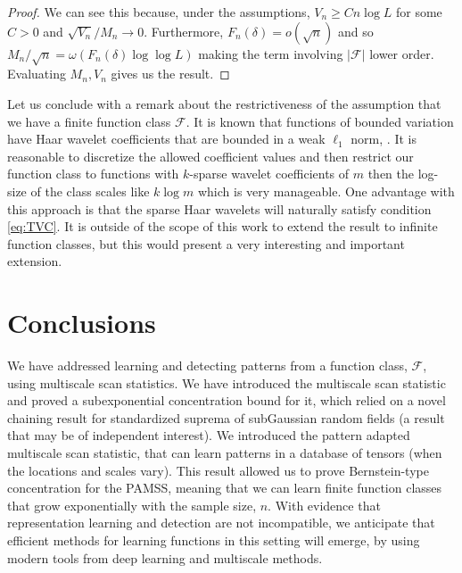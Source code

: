 \begin{proof}
We can see this because, under the assumptions, $V_n \ge C n \log L$ for some $C > 0$ and $\sqrt{V_n} / M_n \rightarrow 0$.
Furthermore, $F_n(\delta) = o(\sqrt{n})$ and so $M_n / \sqrt n = \omega(F_n(\delta) \log \log L)$ making the term involving $|\mathcal F|$ lower order.
Evaluating $M_n,V_n$ gives us the result.
\end{proof}

Let us conclude with a remark about the restrictiveness of the assumption that we have a finite function class $\mathcal F$.
It is known that functions of bounded variation have Haar wavelet coefficients that are bounded in a weak $\ell_1$ norm, \cite{cohen2003harmonic}.
It is reasonable to discretize the allowed coefficient values and then restrict our function class to functions with $k$-sparse wavelet coefficients of $m$ then the log-size of the class scales like $k \log m$ which is very manageable.
One advantage with this approach is that the sparse Haar wavelets will naturally satisfy condition \eqref{eq:TVC}.
It is outside of the scope of this work to extend the result to infinite function classes, but this would present a very interesting and important extension.

\section{Conclusions}

We have addressed learning and detecting patterns from a function class, $\mathcal F$, using multiscale scan statistics.
We have introduced the multiscale scan statistic and proved a subexponential concentration bound for it, which relied on a novel chaining result for standardized suprema of subGaussian random fields (a result that may be of independent interest).
We introduced the pattern adapted multiscale scan statistic, that can learn patterns in a database of tensors (when the locations and scales vary).
This result allowed us to prove Bernstein-type concentration for the PAMSS, meaning that we can learn finite function classes that grow exponentially with the sample size, $n$.
With evidence that representation learning and detection are not incompatible, we anticipate that efficient methods for learning functions in this setting will emerge, by using modern tools from deep learning and multiscale methods.

